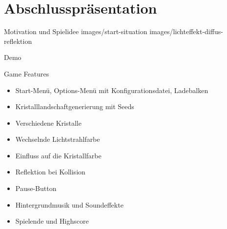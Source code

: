 

\subtitle{Game Programming}



\slidetitle
\section*{Abschlusspräsentation}

\slideonetoonegraphics
{Motivation und Spielidee}
{images/start-situation}
{}
{images/lichteffekt-diffus-reflektion}
{}



\begin{frame}{Demo}
	\centering
\end{frame}

\begin{frame}{Game Features}
	\begin{itemize}
		\item Start-Menü, Options-Menü mit Konfigurationsdatei, Ladebalken
		\item Kristalllandschaftgenerierung mit Seeds
		\item Verschiedene Kristalle
		\item Wechselnde Lichtstrahlfarbe
		\item Einfluss auf die Kristallfarbe
		\item Reflektion bei Kollision
		\item Pause-Button
		\item Hintergrundmusik und Soundeffekte
		\item Spielende und Highscore
	\end{itemize}
\end{frame}

